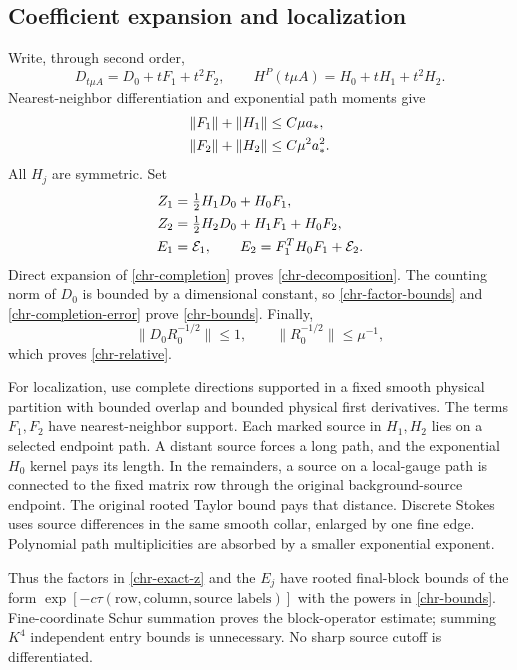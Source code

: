 \subsection{Coefficient expansion and localization}
\label{chr-expansion}

Write, through second order,
\[
 D_{t\mu A}=D_0+tF_1+t^2F_2,\qquad
 H^P(t\mu A)=H_0+tH_1+t^2H_2.
\]
Nearest-neighbor differentiation and exponential path moments give
\begin{align}
 \|F_1\|+\|H_1\|&\leq C\mu a_*,
 \notag\\
 \|F_2\|+\|H_2\|&\leq C\mu^2a_*^2 .
 \label{chr-factor-bounds}
\end{align}
All \(H_j\) are symmetric.  Set
\begin{align}
 Z_1&=\tfrac12H_1D_0+H_0F_1,
 \notag\\
 Z_2&=\tfrac12H_2D_0+H_1F_1+H_0F_2,
 \notag\\
 E_1&={\cal E}_1,\qquad
 E_2=F_1^TH_0F_1+{\cal E}_2 .
 \label{chr-exact-z}
\end{align}
Direct expansion of \eqref{chr-completion} proves
\eqref{chr-decomposition}.  The counting norm of \(D_0\) is bounded
by a dimensional constant, so \eqref{chr-factor-bounds} and
\eqref{chr-completion-error} prove \eqref{chr-bounds}.
Finally,
\[
 \|D_0R_0^{-1/2}\|\leq1,\qquad
 \|R_0^{-1/2}\|\leq\mu^{-1},
\]
which proves \eqref{chr-relative}.

For localization, use complete directions supported in a fixed
smooth physical partition with bounded overlap and bounded physical
first derivatives.  The terms \(F_1,F_2\) have nearest-neighbor
support.  Each marked source in \(H_1,H_2\) lies on a selected
endpoint path.  A distant source forces a long path, and the
exponential \(H_0\) kernel pays its length.  In the remainders,
a source on a local-gauge path is connected to the fixed matrix
row through the original background-source endpoint.  The
original rooted Taylor bound pays that distance.  Discrete
Stokes uses source differences in the same smooth collar,
enlarged by one fine edge.  Polynomial path multiplicities are
absorbed by a smaller exponential exponent.

Thus the factors in \eqref{chr-exact-z} and the \(E_j\) have
rooted final-block bounds of the form
\(\exp[-c\tau(\text{row},\text{column},\text{source labels})]\)
with the powers in \eqref{chr-bounds}.  Fine-coordinate Schur
summation proves the block-operator estimate; summing \(K^4\)
independent entry bounds is unnecessary.  No sharp source cutoff
is differentiated.

